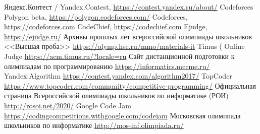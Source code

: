 \documentclass[a4paper]{article}
\begin{document}
\begin{figure}[ht]
\begin{center}
\end{center}
\end{figure}

\newpage


\begin{thebibliography}{3}
 Яндекс.Контест / Yandex.Contest, 
    \url{https://contest.yandex.ru/about/}
 Codeforces Polygon beta, 
    \url{https://polygon.codeforces.com/}
 Codeforces, 
    \url{https://codeforces.com}
 CodeChief, 
    \url{https://codechief.com}
 Ejudge, 
    \url{https://ejudge.ru/}
 Архивы прошлых лет всероссийской олимпиады школьников <<Высшая проба>> 
    \url{https://olymp.hse.ru/mmo/materials-it}
 Timus ( Online Judge 
    \url{https://acm.timus.ru/?locale=ru}
 Сайт дистанционной подготовки к олимпиадам по программированию 
    \url{https://informatics.mccme.ru/}
 Yandex.Algorithm
    \url{https://contest.yandex.com/algorithm2017/}
 TopCoder
    \url{https://www.topcoder.com/community/competitive-programming/}
 Официальная страница Всероссийской олимпиады школьников по информатике (РОИ)
    \url{http://rosoi.net/2020/}
 Google Code Jam
    \url{https://codingcompetitions.withgoogle.com/codejam}
 Московская олимпиада школьников по информатике
    \url{http://mos-inf.olimpiada.ru/}
\end{thebibliography}
\end{document}
